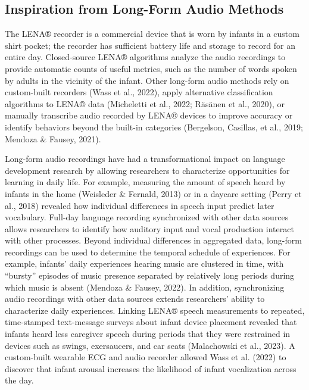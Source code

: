 \documentclass[
  man]{apa6}
\begin{document}
\hypertarget{inspiration-from-long-form-audio-methods}{%
\subsection{Inspiration from Long-Form Audio Methods}\label{inspiration-from-long-form-audio-methods}}

The LENA® recorder is a commercial device that is worn by infants in a custom shirt pocket; the recorder has sufficient battery life and storage to record for an entire day. Closed-source LENA® algorithms analyze the audio recordings to provide automatic counts of useful metrics, such as the number of words spoken by adults in the vicinity of the infant. Other long-form audio methods rely on custom-built recorders (Wass et al., 2022), apply alternative classification algorithms to LENA® data (Micheletti et al., 2022; Räsänen et al., 2020), or manually transcribe audio recorded by LENA® devices to improve accuracy or identify behaviors beyond the built-in categories (Bergelson, Casillas, et al., 2019; Mendoza \& Fausey, 2021).

Long-form audio recordings have had a transformational impact on language development research by allowing researchers to characterize opportunities for learning in daily life. For example, measuring the amount of speech heard by infants in the home (Weisleder \& Fernald, 2013) or in a daycare setting (Perry et al., 2018) revealed how individual differences in speech input predict later vocabulary. Full-day language recording synchronized with other data sources allows researchers to identify how auditory input and vocal production interact with other processes. Beyond individual differences in aggregated data, long-form recordings can be used to determine the temporal schedule of experiences. For example, infants' daily experiences hearing music are clustered in time, with ``bursty'' episodes of music presence separated by relatively long periods during which music is absent (Mendoza \& Fausey, 2022). In addition, synchronizing audio recordings with other data sources extends researchers' ability to characterize daily experiences. Linking LENA® speech measurements to repeated, time-stamped text-message surveys about infant device placement revealed that infants heard less caregiver speech during periods that they were restrained in devices such as swings, exersaucers, and car seats (Malachowski et al., 2023). A custom-built wearable ECG and audio recorder allowed Wass et al. (2022) to discover that infant arousal increases the likelihood of infant vocalization across the day.
\end{document}
